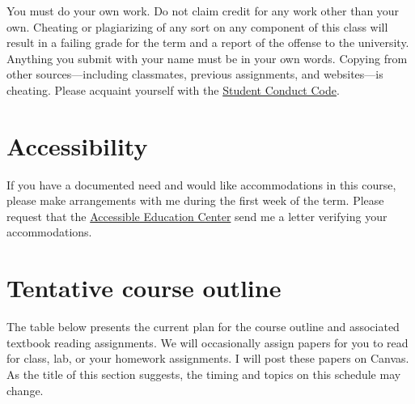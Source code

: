 \documentclass[10pt]{article}
\begin{document}
You must do your own work. Do not claim credit for any work other than your own. Cheating or plagiarizing of any sort on any component of this class will result in a failing grade for the term and a report of the offense to the university. Anything you submit with your name must be in your own words. Copying from other sources---including classmates, previous assignments, and websites---is cheating. Please acquaint yourself with the \href{http://studentlife.uoregon.edu}{Student Conduct Code}.

\section*{Accessibility}

If you have a documented need and would like accommodations in this course, please make arrangements with me during the first week of the term. Please request that the \href{https://aec.uoregon.edu/}{Accessible Education Center} send me a letter verifying your accommodations.

\section*{Tentative course outline}

The table below presents the current plan for the course outline and associated textbook reading assignments. We will occasionally assign papers for you to read for class, lab, or your homework assignments. I will post these papers on Canvas. As the title of this section suggests, the timing and topics on this schedule may change.
\end{document}
